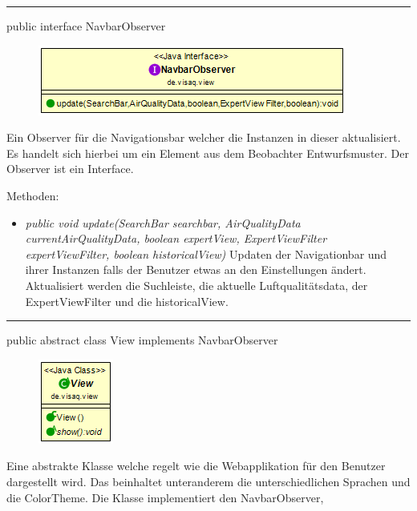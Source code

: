 \rule{\textwidth}{0.4pt} 
public interface NavbarObserver 

\begin{minipage}{0.4\textwidth}
    \begin{figure}[H]
        \includegraphics[scale = 0.5]{media/frontend/view/de.view/NavbarObserver_Class.png}
    \end{figure}
    \end{minipage} \hfill
    \begin{minipage}{0.4\textwidth}
Ein Observer für die Navigationsbar welcher die Instanzen in dieser aktualisiert. Es handelt sich hierbei um ein Element aus dem Beobachter Entwurfsmuster. Der Observer ist ein Interface.
\end{minipage}

Methoden:
\begin{itemize} 
    \item \emph{public void update(SearchBar searchbar, AirQualityData currentAirQualityData,
    boolean expertView, ExpertViewFilter expertViewFilter, boolean historicalView)} Updaten der Navigationbar und ihrer Instanzen falls der Benutzer etwas an den Einstellungen ändert. Aktualisiert werden die Suchleiste, die aktuelle Luftqualitätsdata, der ExpertViewFilter und die historicalView.
\end{itemize}

\rule{\textwidth}{0.4pt} 
public abstract class View implements NavbarObserver

\begin{minipage}{0.3\textwidth}
    \begin{figure}[H]
        \includegraphics[scale = 0.7]{media/frontend/view/de.view/View_Class.png}
    \end{figure}
    \end{minipage} \hfill
    \begin{minipage}{0.6\textwidth}
Eine abstrakte Klasse welche regelt wie die Webapplikation für den Benutzer dargestellt wird. Das beinhaltet unteranderem die unterschiedlichen Sprachen und die ColorTheme. Die Klasse implementiert den NavbarObserver,
\end{minipage}

